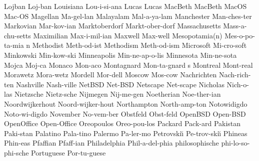 \1 Lojban		Loj-ban		%
\1 Louisiana		Lou-i-si-ana
\1 Lucas		Lucas			%
\1 MacBeth		MacBeth			%
\1 MacOS		Mac-OS			%
\1 Magellan		Ma-gel-lan		%
\1 Malayalam		Mal-a-ya-lam		%
\1 Manchester		Man-ches-ter
\1 Markovian		Mar-kov-ian
\1 Marktoberdorf	Markt-ober-dorf  %
\1 Massachusetts	Mass-a-chu-setts
\1 Maximilian		Max-i-mil-ian		%
\1 Maxwell		Max-well		%
\NewWordtrue
\2 Mesopotamia(n) 	Mes-o-po-ta-mia n	%
\1 Methodist		Meth-od-ist		%
\1 Methodism		Meth-od-ism		%
\1 Microsoft		Mi-cro-soft		%
\1 Minkowski		Min-kow-ski		%
\1 Minneapolis		Min-ne-ap-o-lis
\1 Minnesota		Min-ne-sota
\NewWordtrue
\1 Mojca		Moj-ca			%
\NewWordtrue
\1 Monaco		Mon-aco 		%
\5 Montagnard		Mon-ta-gnard s		%
\1 Montreal		Mont-real		%
\NewWordtrue
\1 Morawetz		Mora-wetz		%
\NewWordtrue
\1 Mordell		Mor-dell		%
\1 Moscow		Mos-cow
\1 Nachrichten          Nach-rich-ten
\1 Nashville		Nash-ville
\1 NetBSD		Net-BSD 		%
\1 Netscape		Net-scape		%
\NewWordtrue
\1 Nicholas		Nich-o-las		%
\1 Nietzsche		Nietz-sche		%
\1 Nijmegen		Nij-me-gen
\1 Noetherian		Noe-ther-ian
\1 Noordwijkerhout	Noord-wijker-hout
\NewWordtrue
\1 Northampton		North-amp-ton		%
\1 Notowidigdo		Noto-wi-digdo		%
\1 November		No-vem-ber
\1 Obstfeld		Obst-feld		%
\1 OpenBSD		Open-BSD		%
\1 OpenOffice		Open-Office		%
\1 Oreopoulos		Oreo-pou-los		%
\NewWordtrue
\1 Packard	 	Pack-ard		%
\NewWordtrue
\1 Pakistan		Paki-stan		%
\1 Palatino		Pala-tino		%
\1 Palermo		Pa-ler-mo
\1 Petrovski\u\i{}	Pe-trov-ski\u\i{}	%
\NewWordtrue
\1 Phineas		Phin-eas		%
\1 Pfaffian		Pfaff-ian		%
\1 Philadelphia		Phil-a-del-phia
\1 philosophische       phi-lo-so-phi-sche	%
\NewWordtrue
\1 Portuguese		Por-tu-guese		%
